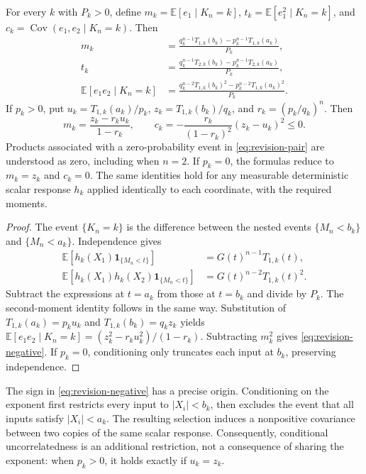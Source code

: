 \begin{theorem}
\label{thm:revision-exact}
For every $k$ with $P_k>0$, define
$m_k=\mathbb E[e_1\mid K_n=k]$,
$t_k=\mathbb E[e_1^2\mid K_n=k]$, and
$c_k=\operatorname{Cov}(e_1,e_2\mid K_n=k)$. Then
\begin{align}
 m_k&=\frac{q_k^{n-1}T_{1,k}(b_k)-p_k^{n-1}T_{1,k}(a_k)}{P_k},
       \label{eq:revision-moment1}\\
 t_k&=\frac{q_k^{n-1}T_{2,k}(b_k)-p_k^{n-1}T_{2,k}(a_k)}{P_k},
       \label{eq:revision-moment2}\\
 \mathbb E[e_1e_2\mid K_n=k]
   &=\frac{q_k^{n-2}T_{1,k}(b_k)^2-p_k^{n-2}T_{1,k}(a_k)^2}{P_k}.
       \label{eq:revision-pair}
\end{align}
If $p_k>0$, put
$u_k=T_{1,k}(a_k)/p_k$,
$z_k=T_{1,k}(b_k)/q_k$, and $r_k=(p_k/q_k)^n$. Then
\begin{equation}\label{eq:revision-negative}
 m_k=\frac{z_k-r_k u_k}{1-r_k},\qquad
 c_k=-\frac{r_k}{(1-r_k)^2}(z_k-u_k)^2\le0.
\end{equation}
Products associated with a zero-probability event in
\eqref{eq:revision-pair} are understood as zero, including when $n=2$.
If $p_k=0$, the formulas reduce to $m_k=z_k$ and $c_k=0$.
The same identities hold for any measurable deterministic scalar response
$h_k$ applied identically to each coordinate, with the required moments.
\end{theorem}

\begin{proof}
The event $\{K_n=k\}$ is the difference between the nested events
$\{M_n<b_k\}$ and $\{M_n<a_k\}$. Independence gives
\begin{align*}
 \mathbb E[h_k(X_1)\mathbf 1_{\{M_n<t\}}]
     &=G(t)^{n-1}T_{1,k}(t),\\
 \mathbb E[h_k(X_1)h_k(X_2)\mathbf 1_{\{M_n<t\}}]
     &=G(t)^{n-2}T_{1,k}(t)^2.
\end{align*}
Subtract the expressions at $t=a_k$ from those at $t=b_k$ and divide by
$P_k$. The second-moment identity follows in the same way. Substitution of
$T_{1,k}(a_k)=p_k u_k$ and $T_{1,k}(b_k)=q_k z_k$ yields
$\mathbb E[e_1e_2\mid K_n=k]=(z_k^2-r_k u_k^2)/(1-r_k)$.
Subtracting $m_k^2$ gives \eqref{eq:revision-negative}. If $p_k=0$,
conditioning only truncates each input at $b_k$, preserving independence.
\end{proof}

The sign in \eqref{eq:revision-negative} has a precise origin. Conditioning
on the exponent first restricts every input to $|X_i|<b_k$, then excludes
the event that all inputs satisfy $|X_i|<a_k$. The resulting selection
induces a nonpositive covariance between two copies of the same scalar
response. Consequently, conditional uncorrelatedness is an additional
restriction, not a consequence of sharing the exponent: when $p_k>0$, it
holds exactly if $u_k=z_k$.

